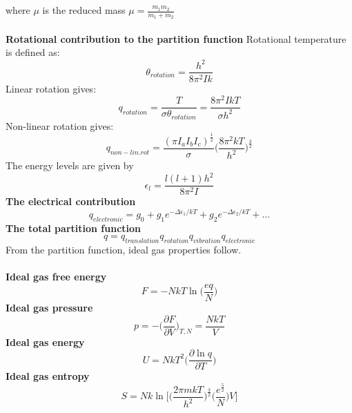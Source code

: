 \documentclass[8pt]{article}
\numberwithin{equation}{section}
\begin{document}
\begin{multicols}{2}
where $\mu$ is the reduced mass $\mu=\frac{m_{1}m_{2}}{m_{1}+m_{2}}$ \\ \\
\textbf{Rotational contribution to the partition function}
Rotational temperature is defined as: 
\begin{equation}
\theta_{rotation}=\frac{h^{2}}{8\pi^{2}Ik} \tag{p. 204}
\end{equation}
Linear rotation gives: 
\begin{equation}
q_{rotation}=\frac{T}{\sigma\theta_{rotation}}=\frac{8\pi^{2}IkT}{\sigma h^{2}} \tag{11.30}
\end{equation}
Non-linear rotation gives: 
\begin{equation}
q_{non-lin.rot}=\frac{(\pi I_{a}I_{b}I_{c})^{\frac{1}{2}}}{\sigma}\bigg(\frac{8\pi^{2}kT}{h^{2}}\bigg)^{\frac{3}{2}} \tag{11.31}
\end{equation}
The energy levels are given by
\begin{equation}
\epsilon_{l}=\frac{l(l+1)h^{2}}{8\pi^{2}I} \tag{11.28}
\end{equation}
\textbf{The electrical contribution}
\begin{equation}
q_{electronic}=g_{0}+g_{1}e^{-\Delta\epsilon_{1}/kT}+g_{2}e^{-\Delta\epsilon_{2}/kT}+... \tag{11.33}
\end{equation}
\textbf{The total partition function}
\begin{equation}
q=q_{translation}q_{rotation}q_{vibration}q_{electronic} \tag{11.35}
\end{equation}
From the partition function, ideal gas properties follow. \\\\
\textbf{Ideal gas free energy}
\begin{equation}
F=-NkT\ln{\bigg(\frac{eq}{N}\bigg)} \tag{11.36}
\end{equation}
\textbf{Ideal gas pressure}
\begin{equation}
p=-\bigg(\frac{\partial F}{\partial V}\bigg)_{T,N}=\frac{NkT}{V} \tag{p. 207}
\end{equation}
\textbf{Ideal gas energy}
\begin{equation}
U=NkT^{2}\bigg(\frac{\partial\ln{q}}{\partial T}\bigg) \tag{p. 208}
\end{equation}
\textbf{Ideal gas entropy}
\begin{equation}
S=Nk\ln{\bigg[\bigg(\frac{2\pi mkT}{h^{2}} \bigg)^{\frac{3}{2}}\bigg(\frac{e^{\frac{5}{2}}}{N}   \bigg)V\bigg]} \tag{11.42}
\end{equation}

\end{multicols}
\end{document}

